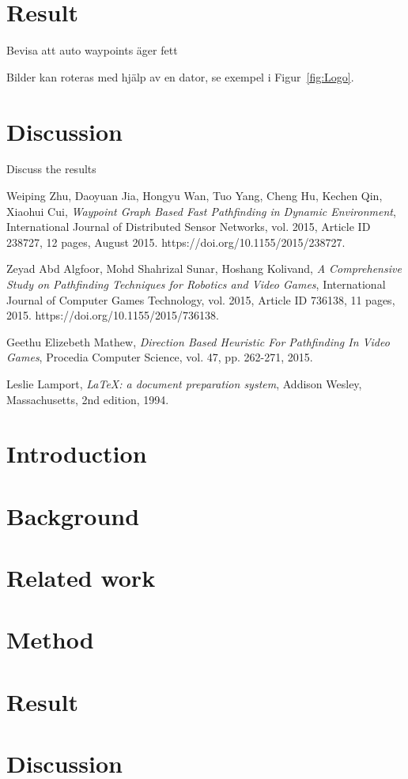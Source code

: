 \documentclass[a4paper]{article}
\begin{document}
\section{Result}
Bevisa att auto waypoints äger fett

Bilder kan roteras med hjälp av en dator, se exempel i Figur~\ref{fig:Logo}.

\section{Discussion}
Discuss the results

\begin{thebibliography}{9}

  Weiping Zhu, Daoyuan Jia, Hongyu Wan, Tuo Yang, Cheng Hu, Kechen Qin, Xiaohui Cui,
  \textit{Waypoint Graph Based Fast Pathfinding in Dynamic Environment},
  International Journal of Distributed Sensor Networks, vol. 2015, Article ID 238727, 12 pages,
  August 2015. https://doi.org/10.1155/2015/238727.

  Zeyad Abd Algfoor, Mohd Shahrizal Sunar, Hoshang Kolivand,
  \textit{A Comprehensive Study on Pathfinding Techniques for Robotics and Video Games},
  International Journal of Computer Games Technology, vol. 2015, Article ID 736138, 11 pages,
  2015. https://doi.org/10.1155/2015/736138.

  Geethu Elizebeth Mathew,
  \textit{Direction Based Heuristic For Pathfinding In Video Games},
  Procedia Computer Science, vol. 47, pp. 262-271,
  2015.

  Leslie Lamport,
  \textit{\LaTeX: a document preparation system},
  Addison Wesley, Massachusetts,
  2nd edition,
  1994.

\end{thebibliography}
\appendix
\cleardoublepage
\section{Introduction}
\section{Background}
\section{Related work}
\section{Method}
\section{Result}
\section{Discussion}
\end{document}
